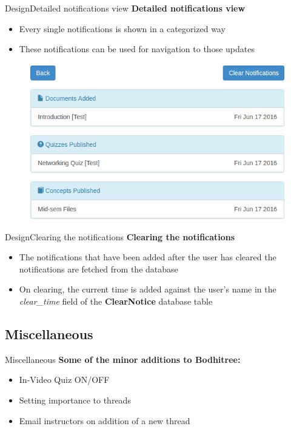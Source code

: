 \documentclass[xcolor=table]{beamer}
\begin{document}
\begin{frame}{Design}{Detailed notifications view}
\textbf{Detailed notifications view}
	\begin{itemize}
		\item Every single notifications is shown in a categorized way
		\item These notifications can be used for navigation to those updates
	\end{itemize}
	\begin{figure}
	\centering
	\includegraphics[width=0.6\linewidth]{./media/detailed_view}
	\label{fig:detailed_view}
	\end{figure}
\end{frame}

\begin{frame}{Design}{Clearing the notifications}
\textbf{Clearing the notifications}
\begin{itemize}
	\item The notifications that have been added after the user has cleared the notifications are fetched from the database
	\item On clearing, the current time is added against the user's name in the \textit{clear\_time} field of the \textbf{ClearNotice} database table
\end{itemize}
\end{frame}

\subsection{Miscellaneous}

\begin{frame}{Miscellaneous}
\textbf{Some of the minor additions to Bodhitree:}
	\begin{itemize}
		\item In-Video Quiz ON/OFF
		\item Setting importance to threads
		\item Email instructors on addition of a new thread
	\end{itemize}
\end{frame}
\end{document}
